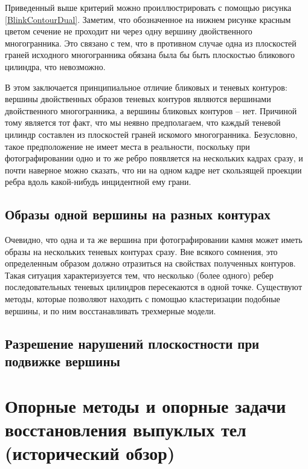 \documentclass[a4paper, 12pt, titlepage]{article}
\theoremstyle{definition}
\theoremstyle{plain}
\theoremstyle{plain}
\begin{document}
Приведенный выше критерий можно проиллюстрировать с помощью рисунка
\ref{BlinkContourDual}. Заметим, что обозначенное на нижнем рисунке красным
цветом сечение не проходит ни через одну вершину двойственного многогранника.
Это связано с тем, что в противном случае одна из плоскостей граней исходного
многогранника обязана была бы быть плоскостью бликового цилиндра, что
невозможно.

В этом заключается принципиальное отличие бликовых и теневых контуров:
вершины двойственных образов теневых контуров являются вершинами двойственного
многогранника, а вершины бликовых контуров -- нет. Причиной тому является тот
факт, что мы неявно предполагаем, что каждый теневой цилиндр составлен из
плоскостей граней искомого многогранника. Безусловно, такое предположение не
имеет места в реальности, поскольку при фотографировании одно и то же ребро
появляется на нескольких кадрах сразу, и почти наверное можно сказать, что ни на
одном кадре нет скользящей проекции ребра вдоль какой-нибудь инцидентной ему
грани.


\subsection{Образы одной вершины на разных контурах}

Очевидно, что одна и та же вершина при фотографировании камня может иметь образы
на нескольких теневых контурах сразу. Вне всякого сомнения, это определенным
образом должно отразиться на свойствах полученных контуров. Такая ситуация
характеризуется тем, что несколько (более одного) ребер последовательных теневых
цилиндров пересекаются в одной точке. Существуют методы, которые позволяют
находить с помощью кластеризации подобные вершины, и по ним восстанавливать
трехмерные модели.



\subsection{Разрешение нарушений плоскостности при подвижке вершины}


\section{Опорные методы и опорные задачи восстановления выпуклых
тел (исторический обзор)}
\end{document}
